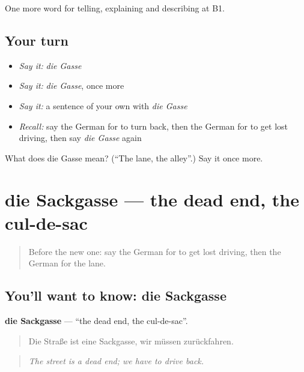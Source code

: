 \begin{grammarlens}[title={What you've built}]
One more word for telling, explaining and describing at B1.
\end{grammarlens}

\subsection*{Your turn}
\begin{itemize}
\raggedright
  \item \emph{Say it:} \emph{die Gasse}
  \item \emph{Say it:} \emph{die Gasse}, once more
  \item \emph{Say it:} a sentence of your own with \emph{die Gasse}
  \item \emph{Recall:} say the German for to turn back, then the German for to get lost driving, then say \emph{die Gasse} again
\end{itemize}

\begin{tcolorbox}[breakable,colback=teal!4,colframe=teal!35!black,title={Before you move on}]
What does die Gasse mean? (\textquotedblleft{}The lane, the alley\textquotedblright{}.) Say it once more.
\end{tcolorbox}
\section[die Sackgasse]{die Sackgasse — the dead end, the cul-de-sac}

\label{lesson:GE-C436-sackgasse}



\begin{quote}
Before the new one: say the German for to get lost driving, then the German for the lane.
\end{quote}

\subsection*{You'll want to know: die Sackgasse}
\textbf{die Sackgasse} — \textquotedblleft{}the dead end, the cul-de-sac\textquotedblright{}.

\begin{quote}
Die Straße ist eine Sackgasse, wir müssen zurückfahren.
\end{quote}

\begin{quote}
\emph{The street is a dead end; we have to drive back.}
\end{quote}

